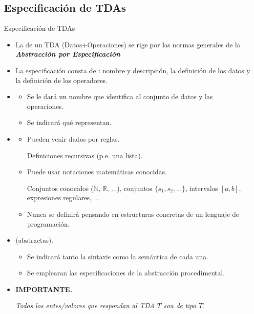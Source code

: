 \documentclass[10pt,envcountsect,spanish]{beamer}
\begin{document}
\subsection{Especificación de TDAs}
\begin{frame}{Especificación de TDAs}

\begin{itemize}
\item La  de un TDA (Datos+Operaciones) se rige por las normas generales de la \textit{\bf Abstracción por Especificación}

\item La especificación consta de : nombre y descripción, la definición de los datos y la definición de los operadores.

\item {}
\begin{itemize}
\item Se le dará un nombre que identifica al conjunto de datos y las operaciones.
\item Se indicará qué representan.
\end{itemize}


\item {}
\begin{itemize}

	
\item Pueden venir dados por reglas.

\unEjemplo Definiciones recursivas (p.e. una lista).


\item Puede usar notaciones matemáticas conocidas.

\unEjemplo Conjuntos conocidos ($\mathbb{N}$, $\mathbb{R}$, ...), conjuntos $\{s_1,s_2,\ldots\}$, intervalos $[a, b]$, expresiones regulares, ... 

\item Nunca se definirá pensando en estructuras concretas de un lenguaje de programación. 

\end{itemize}


\item {} (abstractas).

\begin{itemize}
\item Se indicará tanto la sintaxis como la semántica de cada una. 
\item Se emplearan las especificaciones de la abstracción procedimental.
\end{itemize}


\item \textbf{IMPORTANTE.}  

\centerline{\it Todos los entes/valores que respondan al TDA $T$ son de tipo $T$.}

\end{itemize}
\end{frame}
\end{document}
